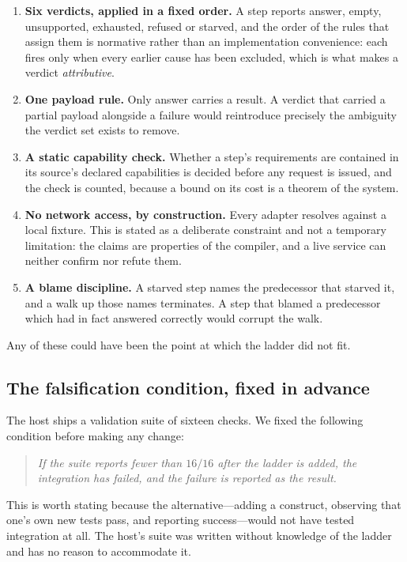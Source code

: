 \documentclass[11pt,twocolumn,a4paper]{article}
\theoremstyle{plain}
\theoremstyle{definition}
\theoremstyle{remark}
\newcommand{\vans}{\textsf{answer}}
\newcommand{\vempty}{\textsf{empty}}
\newcommand{\vsurf}{\textsf{unsupported}}
\newcommand{\vtime}{\textsf{exhausted}}
\newcommand{\vref}{\textsf{refused}}
\newcommand{\vstarve}{\textsf{starved}}
\begin{document}
\begin{enumerate}[leftmargin=2em,itemsep=0.35em]
\item \textbf{Six verdicts, applied in a fixed order.} A step reports
\vans, \vempty, \vsurf, \vtime, \vref{} or \vstarve, and the order of the rules
that assign them is normative rather than an implementation convenience: each
fires only when every earlier cause has been excluded, which is what makes a
verdict \emph{attributive}.
\item \textbf{One payload rule.} Only \vans{} carries a result. A verdict that
carried a partial payload alongside a failure would reintroduce precisely the
ambiguity the verdict set exists to remove.
\item \textbf{A static capability check.} Whether a step's requirements are
contained in its source's declared capabilities is decided before any request
is issued, and the check is counted, because a bound on its cost is a theorem
of the system.
\item \textbf{No network access, by construction.} Every adapter resolves
against a local fixture. This is stated as a deliberate constraint and not a
temporary limitation: the claims are properties of the compiler, and a live
service can neither confirm nor refute them.
\item \textbf{A blame discipline.} A starved step names the predecessor that
starved it, and a walk up those names terminates. A step that blamed a
predecessor which had in fact answered correctly would corrupt the walk.
\end{enumerate}

Any of these could have been the point at which the ladder did not fit.

\subsection{The falsification condition, fixed in advance}

The host ships a validation suite of sixteen checks. We fixed the following
condition before making any change:

\begin{quote}
\emph{If the suite reports fewer than $16/16$ after the ladder is added, the
integration has failed, and the failure is reported as the result.}
\end{quote}

This is worth stating because the alternative---adding a construct, observing
that one's own new tests pass, and reporting success---would not have tested
integration at all. The host's suite was written without knowledge of the
ladder and has no reason to accommodate it.
\end{document}
